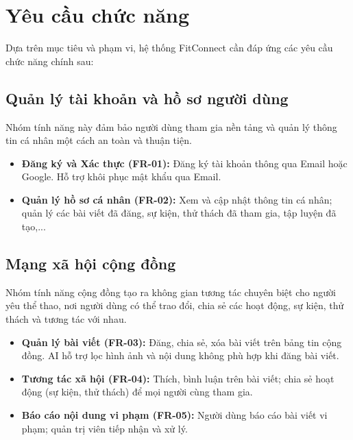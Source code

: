 \label{chap:analysis_requirements}

\section{Yêu cầu chức năng }
Dựa trên mục tiêu và phạm vi, hệ thống FitConnect cần đáp ứng các yêu cầu chức năng chính sau:

\subsection{Quản lý tài khoản và hồ sơ người dùng}
Nhóm tính năng này đảm bảo người dùng tham gia nền tảng và quản lý thông tin cá nhân một cách an toàn và thuận tiện.
\begin{itemize}
    \item \textbf{Đăng ký và Xác thực (FR-01):} Đăng ký tài khoản thông qua Email hoặc Google. Hỗ trợ khôi phục mật khẩu qua Email.
    \item \textbf{Quản lý hồ sơ cá nhân (FR-02):} Xem và cập nhật thông tin cá nhân; quản lý các bài viết đã đăng, sự kiện, thử thách đã tham gia, tập luyện đã tạo,...
\end{itemize}

\subsection{Mạng xã hội cộng đồng}
Nhóm tính năng cộng đồng tạo ra không gian tương tác chuyên biệt cho người yêu thể thao, nơi người dùng có thể trao đổi, chia sẻ các hoạt động, sự kiện, thử thách và tương tác với nhau.
\begin{itemize}
    \item \textbf{Quản lý bài viết (FR-03):} Đăng, chia sẻ, xóa bài viết trên bảng tin cộng đồng. AI hỗ trợ lọc hình ảnh và nội dung không phù hợp khi đăng bài viết.
    \item \textbf{Tương tác xã hội (FR-04):} Thích, bình luận trên bài viết; chia sẻ hoạt động (sự kiện, thử thách) để mọi người cùng tham gia.
    \item \textbf{Báo cáo nội dung vi phạm (FR-05):} Người dùng báo cáo bài viết vi phạm; quản trị viên tiếp nhận và xử lý.
\end{itemize}

